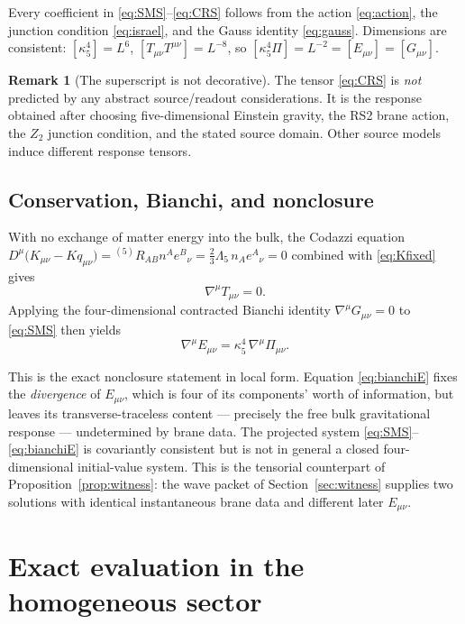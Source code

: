 \documentclass[11pt,a4paper]{article}
\theoremstyle{plain}
\theoremstyle{definition}
\newtheorem{remark}[theorem]{Remark}
\newcommand{\kfive}{\kappa_5}
\newcommand{\Lfive}{\Lambda_5}
\begin{document}
Every coefficient in \eqref{eq:SMS}--\eqref{eq:CRS} follows from the
action \eqref{eq:action}, the junction condition \eqref{eq:israel}, and
the Gauss identity \eqref{eq:gauss}. Dimensions are consistent:
$[\kfive^4]=L^6$, $[T_{\mu\nu}T^{\mu\nu}]=L^{-8}$, so
$[\kfive^4\Pi]=L^{-2}=[E_{\mu\nu}]=[G_{\mu\nu}]$.

\begin{remark}[The superscript is not decorative]
The tensor \eqref{eq:CRS} is \emph{not} predicted by any abstract
source/readout considerations. It is the response obtained after choosing
five-dimensional Einstein gravity, the RS2 brane action, the $Z_2$
junction condition, and the stated source domain. Other source models
induce different response tensors.
\end{remark}

\subsection{Conservation, Bianchi, and nonclosure}
\label{sec:conservation}

With no exchange of matter energy into the bulk, the Codazzi equation
$D^\mu\bigl(K_{\mu\nu}-Kq_{\mu\nu}\bigr)
={}^{(5)}R_{AB}n^Ae^B{}_\nu=\tfrac23\Lfive\,n_Ae^A{}_\nu=0$
combined with \eqref{eq:Kfixed} gives
\begin{equation}
\label{eq:Tcons}
\nabla^\mu T_{\mu\nu}=0 .
\end{equation}
Applying the four-dimensional contracted Bianchi identity
$\nabla^\mu G_{\mu\nu}=0$ to \eqref{eq:SMS} then yields
\begin{equation}
\label{eq:bianchiE}
\boxed{\;
\nabla^\mu E_{\mu\nu}
=\kfive^4\,\nabla^\mu\Pi_{\mu\nu}.
\;}
\end{equation}

This is the exact nonclosure statement in local form. Equation
\eqref{eq:bianchiE} fixes the \emph{divergence} of $E_{\mu\nu}$, which is
four of its components' worth of information, but leaves its
transverse-traceless content --- precisely the free bulk gravitational
response --- undetermined by brane data. The projected system
\eqref{eq:SMS}--\eqref{eq:bianchiE} is covariantly consistent but is not
in general a closed four-dimensional initial-value system. This is the
tensorial counterpart of Proposition~\ref{prop:witness}: the wave packet
of Section~\ref{sec:witness} supplies two solutions with identical
instantaneous brane data and different later $E_{\mu\nu}$.

\section{Exact evaluation in the homogeneous sector}
\label{sec:frw}
\end{document}
